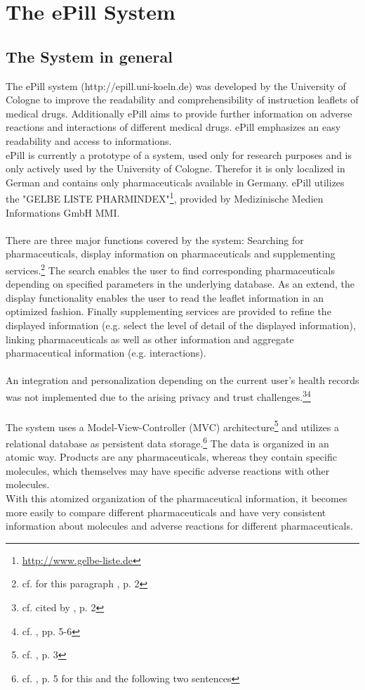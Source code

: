 \section{The ePill System}

\subsection{The System in general}
The ePill system (http://epill.uni-koeln.de) was developed by the University of Cologne to improve the readability and comprehensibility of instruction leaflets of medical drugs. Additionally ePill aims to provide further information on adverse reactions and interactions of different medical drugs. ePill emphasizes an easy readability and access to informations.
\\
ePill is currently a prototype of a system, used only for research purposes and is only actively used by the University of Cologne. Therefor it is only localized in German and contains only pharmaceuticals available in Germany. ePill utilizes the "GELBE LISTE PHARMINDEX"\footnote{\url{http://www.gelbe-liste.de}}, provided by Medizinische Medien Informations GmbH MMI.
\\
\\
There are three major functions covered by the system: Searching for pharmaceuticals, display information on pharmaceuticals and supplementing services.\footnote{cf. for this paragraph \cite{Dehling.2012}, p. 2} The search enables the user to find corresponding pharmaceuticals depending on specified parameters in the underlying database. As an extend, the display functionality enables the user to read the leaflet information in an optimized fashion. Finally supplementing services are provided to refine the displayed information (e.g. select the level of detail of the displayed information), linking pharmaceuticals as well as other information and aggregate pharmaceutical information (e.g. interactions).
\\
\\
An integration and personalization depending on the current user's health records was not implemented due to the arising privacy and trust challenges.\footnote{cf. \cite{Kaletsch.2011} cited by \cite{Dehling.2012}, p. 2}\footnote{cf. \cite{Kaletsch.2011}, pp. 5-6}
\\
\\
The system uses a Model-View-Controller (MVC) architecture\footnote{cf. \cite{Dehling.2012}, p. 3} and utilizes a relational database  as persistent data storage.\footnote{cf. \cite{Dehling.2012}, p. 5 for this and the following two sentences} The data is organized in an atomic way. Products are any pharmaceuticals, whereas they contain specific molecules, which themselves may have specific adverse reactions with other molecules. 
\\
With this atomized organization of the pharmaceutical information, it becomes more easily to compare different pharmaceuticals and have very consistent information about molecules and adverse reactions for different pharmaceuticals.

